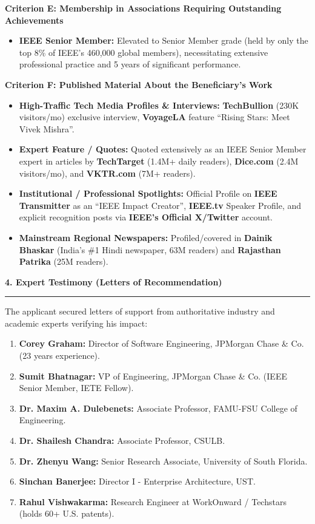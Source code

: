 \documentclass[11pt]{article}
\begin{document}
\vspace{0.5em}
{\large\bfseries Criterion E: Membership in Associations Requiring Outstanding Achievements}
\begin{itemize}
    \item \textbf{IEEE Senior Member:} Elevated to Senior Member grade (held by only the top 8\% of IEEE's 460,000 global members), necessitating extensive professional practice and 5 years of significant performance.
\end{itemize}

\vspace{0.5em}
{\large\bfseries Criterion F: Published Material About the Beneficiary's Work}
\begin{itemize}
    \item \textbf{High-Traffic Tech Media Profiles \& Interviews:} \textbf{TechBullion} (230K visitors/mo) exclusive interview, \textbf{VoyageLA} feature ``Rising Stars: Meet Vivek Mishra''.
    \item \textbf{Expert Feature / Quotes:} Quoted extensively as an IEEE Senior Member expert in articles by \textbf{TechTarget} (1.4M+ daily readers), \textbf{Dice.com} (2.4M visitors/mo), and \textbf{VKTR.com} (7M+ readers).
    \item \textbf{Institutional / Professional Spotlights:} Official Profile on \textbf{IEEE Transmitter} as an ``IEEE Impact Creator'', \textbf{IEEE.tv} Speaker Profile, and explicit recognition posts via \textbf{IEEE's Official X/Twitter} account.
    \item \textbf{Mainstream Regional Newspapers:} Profiled/covered in \textbf{Dainik Bhaskar} (India's \#1 Hindi newspaper, 63M readers) and \textbf{Rajasthan Patrika} (25M readers).
\end{itemize}

\vspace{1em}
{\Large\bfseries\color{blue!60!black} 4. Expert Testimony (Letters of Recommendation)} \hrule\vspace{0.5em}
The applicant secured letters of support from authoritative industry and academic experts verifying his impact:
\begin{enumerate}
    \item \textbf{Corey Graham:} Director of Software Engineering, JPMorgan Chase \& Co. (23 years experience).
    \item \textbf{Sumit Bhatnagar:} VP of Engineering, JPMorgan Chase \& Co. (IEEE Senior Member, IETE Fellow).
    \item \textbf{Dr. Maxim A. Dulebenets:} Associate Professor, FAMU-FSU College of Engineering.
    \item \textbf{Dr. Shailesh Chandra:} Associate Professor, CSULB.
    \item \textbf{Dr. Zhenyu Wang:} Senior Research Associate, University of South Florida.
    \item \textbf{Sinchan Banerjee:} Director I - Enterprise Architecture, UST.
    \item \textbf{Rahul Vishwakarma:} Research Engineer at WorkOnward / Techstars (holds 60+ U.S. patents).
\end{enumerate}
\end{document}
